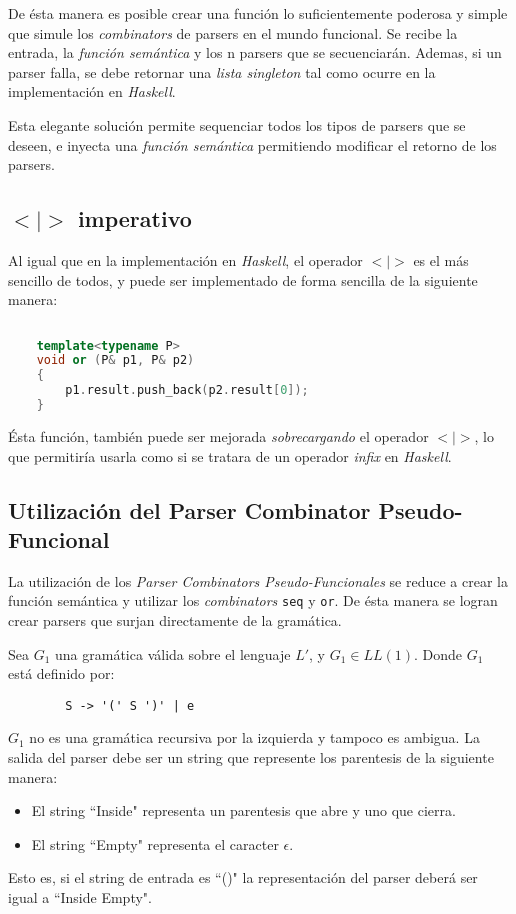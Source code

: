 	De ésta manera es posible crear una función lo suficientemente poderosa y simple que simule los \emph{combinators} de parsers en el mundo funcional. Se recibe la entrada, la \emph{función semántica} y los n parsers que se secuenciarán. Ademas, si un parser falla, se debe retornar una \emph{lista singleton} tal como ocurre en la implementación en \emph{Haskell}.
	
	Esta elegante solución permite sequenciar todos los tipos de parsers que se deseen, e inyecta una \emph{función semántica} permitiendo modificar el retorno de los parsers.
	
	\subsection{$<|>$ imperativo}
	Al igual que en la implementación en \emph{Haskell}, el operador $<|>$ es el más sencillo de todos, y puede ser implementado de forma sencilla de la siguiente manera:
	\begin{lstlisting}[language=C++, caption=función de elección en C++]
	
	template<typename P>
	void or (P& p1, P& p2)
	{
		p1.result.push_back(p2.result[0]);
	}	
	\end{lstlisting}
		
	Ésta función, también puede ser mejorada \emph{sobrecargando} el operador $<|>$, lo que permitiría usarla como si se tratara de un operador \emph{infix} en \emph{Haskell}.
	
	\subsection{Utilización del Parser Combinator Pseudo-Funcional}
	La utilización de los \emph{Parser Combinators Pseudo-Funcionales} se reduce a crear la función semántica y utilizar los \emph{combinators} \texttt{seq} y \texttt{or}. De ésta manera se logran crear parsers que surjan directamente de la gramática.
	
	\begin{exmp}
		Sea $G_1$ una gramática válida sobre el lenguaje $L'$, y $G_1 \in LL(1)$.
		Donde $G_1$ está definido por:
		
		\begin{lstlisting}
		S -> '(' S ')' | e
		\end{lstlisting}
		
		$G_1$ no es una gramática recursiva por la izquierda y tampoco es ambigua.
		La salida del parser debe ser un string que represente los parentesis de la siguiente manera:
		\begin{itemize}
			\item El string ``Inside" representa un parentesis que abre y uno que cierra.
			\item El string ``Empty" representa el caracter $\epsilon$.
		\end{itemize}
		Esto es, si el string de entrada es ``()" la representación del parser deberá ser igual a ``Inside Empty".		
	\end{exmp}
	
